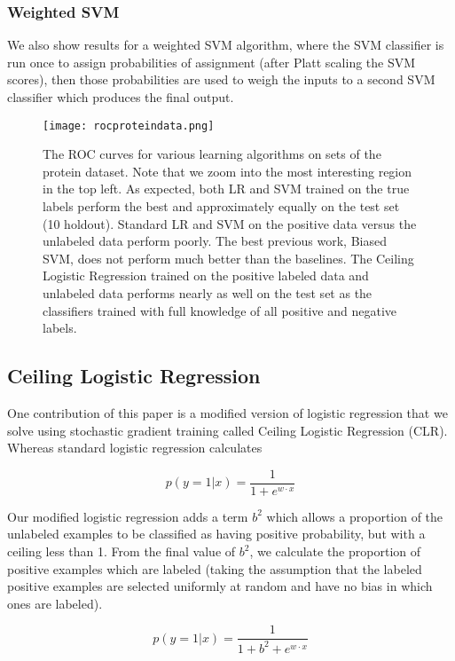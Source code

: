 \documentclass{article}
\begin{document}
\subsubsection{Weighted SVM}

We also show results for a weighted SVM algorithm, where the SVM classifier is run once to assign probabilities of assignment (after Platt scaling the SVM scores), then those probabilities are used to weigh the inputs to a second SVM classifier which produces the final output.

\begin{figure*}[ht!]
\vskip 0.2in
\begin{center}
\centerline{\texttt{[image: rocproteindata.png]}}
\caption{The ROC curves for various learning algorithms on sets of the protein dataset.  Note that we zoom into the most interesting region in the top left.  As expected, both LR and SVM trained on the true labels perform the best and approximately equally on the test set (10 holdout). Standard LR and SVM on the positive data versus the unlabeled data perform poorly.  The best previous work, Biased SVM, does not perform much better than the baselines.  The Ceiling Logistic Regression trained on the positive labeled data and unlabeled data performs nearly as well on the test set as the classifiers trained with full knowledge of all positive and negative labels.}
\label{roc}
\end{center}
\vskip -0.2in
\end{figure*}
\subsection{Ceiling Logistic Regression}

One contribution of this paper is a modified version of logistic regression that we solve using stochastic gradient training called Ceiling Logistic Regression (CLR).  Whereas standard logistic regression calculates

$$ p(y=1|x) = \frac{1}{1 + e^{w \cdot x}} $$

Our modified logistic regression adds a term $b^2$ which allows a proportion of the unlabeled examples to be classified as having positive probability, but with a ceiling less than 1. From the final value of $b^2$, we calculate the proportion of positive examples which are labeled (taking the assumption that the labeled positive examples are selected uniformly at random and have no bias in which ones are labeled).

$$ p(y=1|x) = \frac{1}{1 + b^2 + e^{w \cdot x}} $$
\end{document}
